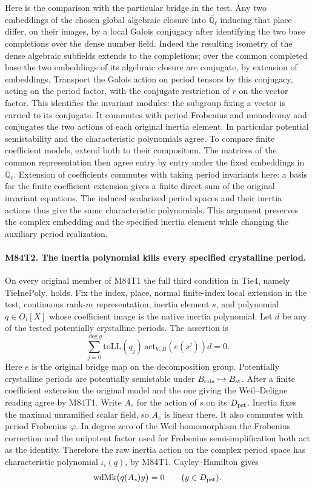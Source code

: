 Here is the comparison with the particular bridge in the test.
Any two embeddings of the chosen global algebraic closure into
$\overline{\mathbb Q}_\ell$ inducing that place differ, on their
images, by a local Galois conjugacy after identifying the two
base completions over the dense number field. Indeed the resulting
isometry of the dense algebraic subfields extends to the completions;
over the common completed base the two embeddings of its algebraic
closure are conjugate, by extension of embeddings. Transport the
Galois action on period tensors by this conjugacy, acting on the
period factor, with the conjugate restriction of $r$ on the vector
factor. This identifies the invariant modules: the subgroup fixing
a vector is carried to its conjugate. It commutes with period
Frobenius and monodromy and conjugates the two actions of each
original inertia element. In particular potential semistability
and the characteristic polynomials agree. To compare finite
coefficient models, extend both to their compositum. The matrices
of the common representation then agree entry by entry under the
fixed embeddings in $\overline{\mathbb Q}_\ell$. Extension of
coefficients commutes with taking period invariants here: a basis
for the finite coefficient extension gives a finite direct sum of
the original invariant equations. The induced scalarized period
spaces and their inertia actions thus give the same characteristic
polynomials. This argument preserves the complex embedding and
the specified inertia element while changing the auxiliary
period realization.

\paragraph{M84T2. The inertia polynomial kills every specified crystalline period.}
On every original member of M84T1 the full third condition in
$\mathrm{Tie4}$, namely $\mathrm{TieInePoly}$, holds. Fix the
index, place, normal finite-index local extension in the test,
continuous rank-$m$ representation, inertia element $s$, and
polynomial $q\in O_i[X]$ whose coefficient image is the native
inertia polynomial. Let $d$ be any of the tested potentially
crystalline periods. The assertion is
\[
  \sum_{j=0}^{\deg q} \mathrm{toLL}(q_j)\,
                      \mathrm{act}_{V,B}(e(s^j))d=0 .
\]
Here $e$ is the original bridge map on the decomposition group.
Potentially crystalline periods are potentially semistable under
$B_{\rm cris}\hookrightarrow B_{\rm st}$. After a finite coefficient
extension the original model and the one giving the Weil--Deligne
reading agree by M84T1. Write $A_s$ for the action of $s$ on its
$D_{\rm pst}$. Inertia fixes the maximal unramified scalar field,
so $A_s$ is linear there. It also commutes with period Frobenius
$\varphi$. In degree zero of the Weil homomorphism the Frobenius
correction and the unipotent factor used for Frobenius
semisimplification both act as the identity. Therefore the raw
inertia action on the complex period space has characteristic
polynomial $\iota_i(q)$, by M84T1. Cayley--Hamilton gives
\[
             \mathrm{wdMk}\big(q(A_s)y\big)=0
                    \qquad (y\in D_{\rm pst}).
\]

